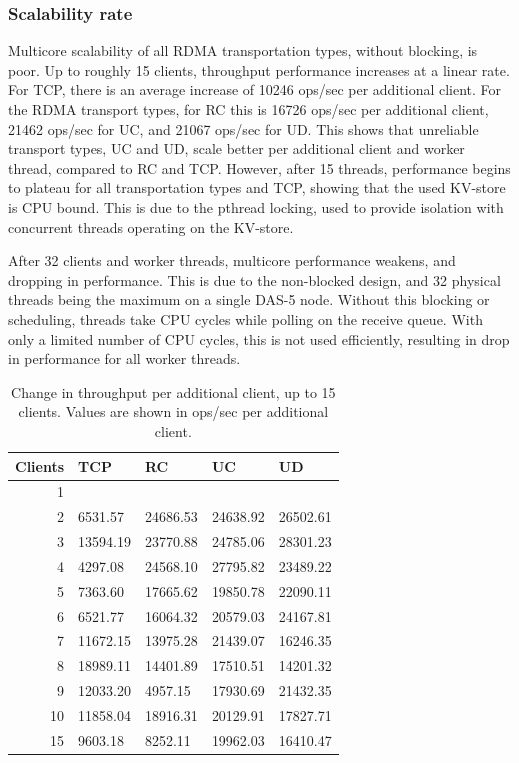 \subsubsection{Scalability rate}\label{subsec:scalability-rate}
Multicore scalability of all RDMA transportation types, without blocking, is poor.
Up to roughly 15 clients, throughput performance increases at a linear rate.
For TCP, there is an average increase of 10246 ops/sec per additional client.
For the RDMA transport types, for RC this is 16726 ops/sec per additional client, 21462 ops/sec for UC, and 21067 ops/sec for UD.
This shows that unreliable transport types, UC and UD, scale better per additional client and worker thread, compared to RC and TCP.
However, after 15 threads, performance begins to plateau for all transportation types and TCP, showing that the used KV-store is CPU bound.
This is due to the pthread locking, used to provide isolation with concurrent threads operating on the KV-store.

After 32 clients and worker threads, multicore performance weakens, and dropping in performance.
This is due to the non-blocked design, and 32 physical threads being the maximum on a single DAS-5 node.
Without this blocking or scheduling, threads take CPU cycles while polling on the receive queue.
With only a limited number of CPU cycles, this is not used efficiently, resulting in drop in performance for all worker threads.

\begin{table}
    \centering
    \begin{tabular}{rllll}
        \toprule
        \textbf{Clients} & \textbf{TCP} & \textbf{RC} & \textbf{UC} & \textbf{UD} \\
        \midrule
        1 &  &  &  &  \\
        2 & 6531.57 & 24686.53 & 24638.92 & 26502.61 \\
        3 & 13594.19 & 23770.88 & 24785.06 & 28301.23 \\
        4 & 4297.08 & 24568.10 & 27795.82 & 23489.22 \\
        5 & 7363.60 & 17665.62 & 19850.78 & 22090.11 \\
        6 & 6521.77 & 16064.32 & 20579.03 & 24167.81 \\
        7 & 11672.15 & 13975.28 & 21439.07 & 16246.35 \\
        8 & 18989.11 & 14401.89 & 17510.51 & 14201.32 \\
        9 & 12033.20 & 4957.15 & 17930.69 & 21432.35 \\
        10 & 11858.04 & 18916.31 & 20129.91 & 17827.71 \\
        15 & 9603.18 & 8252.11 & 19962.03 & 16410.47 \\
        \bottomrule
    \end{tabular}
    \caption[Change in throughput per additional client, up to 15 clients.]{Change in throughput per additional client, up to 15 clients. Values are shown in ops/sec per additional client.}
    \label{tab:throughput_add_client}
\end{table}

